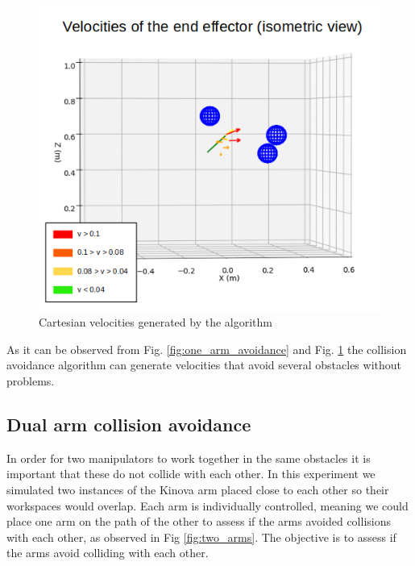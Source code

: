 \documentclass[a4paper, 10pt, conference]{ieeeconf}      %
\begin{document}
\begin{figure}[H]
	\includegraphics[scale=0.30]{images/one_arm_three_obstacles_side_vector.png}
	\caption{Cartesian velocities generated by the algorithm}
	\label{fig:one_arm_avoidance_vector}
\end{figure}

As it can be observed from Fig. \ref{fig:one_arm_avoidance} and Fig. \ref{fig:one_arm_avoidance_vector} the collision avoidance algorithm can generate velocities that avoid several obstacles without problems. 

\subsection{Dual arm collision avoidance} %

In order for two manipulators to work together in the same obstacles it is important that these do not collide with each other. In this experiment we simulated two instances of the Kinova arm placed close to each other so their workspaces would overlap. Each arm is individually controlled, meaning we could place one arm on the path of the other to assess if the arms avoided collisions with each other, as observed in Fig \ref{fig:two_arms}. The objective is to assess if the arms avoid colliding with each other.
\end{document}
